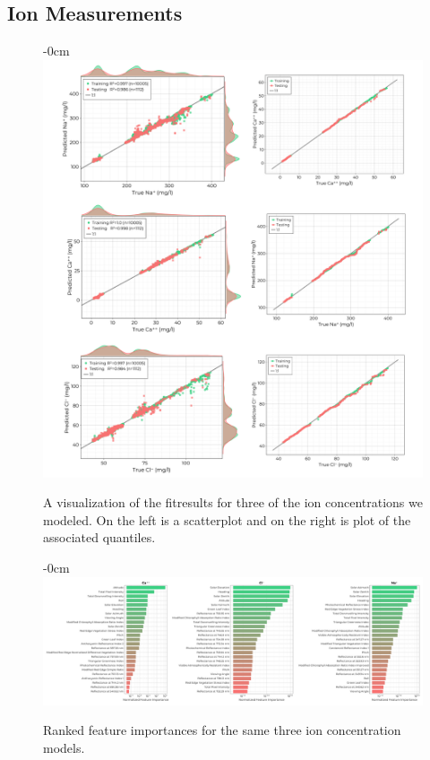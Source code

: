 \documentclass[journal,article,submit,pdftex,moreauthors]{Definitions/mdpi}
\begin{document}
\subsection{Ion Measurements}

\begin{figure}[H]
\begin{adjustwidth}{-\extralength}{0cm}
\centering
\includegraphics[width=16.0cm]{paper/figures/results/fits/ions-fitres.pdf}
\end{adjustwidth}
\caption{A visualization of the fitresults for three of the ion concentrations we modeled. On the left is a scatterplot and on the right is plot of the associated quantiles.\label{fig:ions-fit}}
\end{figure}  

\begin{figure}[H]
\begin{adjustwidth}{-\extralength}{0cm}
\centering
\includegraphics[width=18.0cm]{paper/figures/results/fits/ions-ranking.pdf}
\end{adjustwidth}
\caption{Ranked feature importances for the same three ion concentration models.\label{fig:ions-fit}}
\end{figure}  
\end{document}
